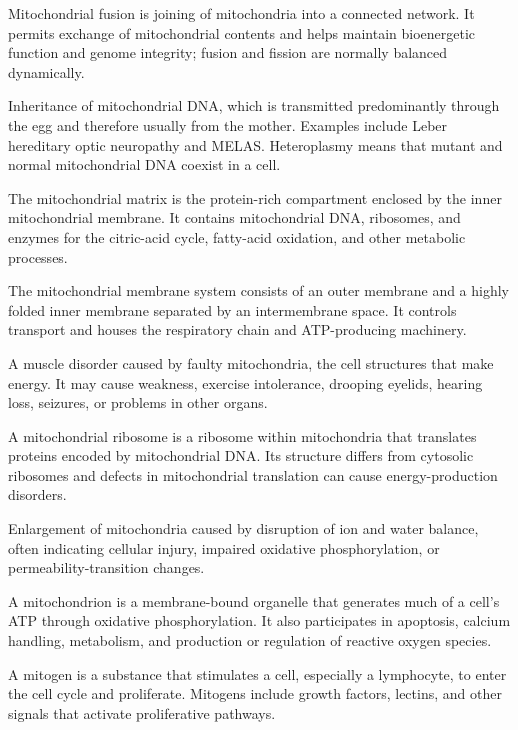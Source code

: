  Mitochondrial fusion is joining of mitochondria into a connected network. It permits exchange of mitochondrial contents and helps maintain bioenergetic function and genome integrity; fusion and fission are normally balanced dynamically.

 Inheritance of mitochondrial DNA, which is transmitted predominantly through the egg and therefore usually
from the mother. Examples include Leber hereditary optic neuropathy and MELAS. Heteroplasmy
means that mutant and normal mitochondrial DNA coexist in a cell.

 The mitochondrial matrix is the protein-rich compartment enclosed by the inner mitochondrial membrane. It contains mitochondrial DNA, ribosomes, and enzymes for the citric-acid cycle, fatty-acid oxidation, and other metabolic processes.

 The mitochondrial membrane system consists of an outer membrane and a highly folded inner membrane separated by an intermembrane space. It controls transport and houses the respiratory chain and ATP-producing machinery.

 A muscle disorder caused by faulty mitochondria, the cell structures that make energy. It may cause weakness, exercise intolerance, drooping eyelids, hearing loss, seizures, or problems in other organs.

 A mitochondrial ribosome is a ribosome within mitochondria that translates proteins encoded by mitochondrial DNA. Its structure differs from cytosolic ribosomes and defects in mitochondrial translation can cause energy-production disorders.

 Enlargement of mitochondria caused by disruption of ion and water balance, often indicating cellular injury, impaired oxidative phosphorylation, or permeability-transition changes.

 A mitochondrion is a membrane-bound organelle that generates much of a cell’s ATP through oxidative phosphorylation. It also participates in apoptosis, calcium handling, metabolism, and production or regulation of reactive oxygen species.

 A mitogen is a substance that stimulates a cell, especially a lymphocyte, to enter the cell cycle and proliferate. Mitogens include growth factors, lectins, and other signals that activate proliferative pathways.

